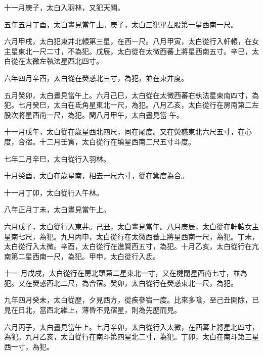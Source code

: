 \begin{pinyinscope}
 十一月庚子，太白入羽林，又犯天關。



 五年五月丁酉，太白晝見當午上。庚子，太白三犯畢左股第一星西南一尺。



 六月甲戌，太白犯東井北轅第三星，在西一尺。八月甲寅，太白從行入軒轅，在女主星東北一尺二寸，不為犯。戊辰，太白從在太微西蕃上將星西南五寸。辛巳，太白從在太微左執法星西北四寸。



 六年四月辛酉，太白從在熒惑北三寸，為犯，並在東井度。



 五月癸卯，太白晝見當午上。六月己巳，太白從在太微西蕃右執法星東南四寸，為犯。七月癸巳，太白在氐角星東北一尺，為犯。八月乙亥，太白從行在房南第二左股次將星西南一尺，為犯。閏八月甲午，太白晝見當
 午。



 十一月戊午，太白從在歲星西北四尺，同在尾度。又在熒惑東北六尺五寸，在心度，合宿。十二月壬寅，太白從行在填星西南二尺五寸斗度。



 七年二月辛巳，太白從行入羽林。



 十月癸酉，太白在歲星南，相去一尺六寸，從在箕度為合。



 十一月丁卯，太白從行入午林。



 八年正月丁未，太白晝見當午上。



 六月戊子，太白從行入東井。己丑，太白晝見當午。八月庚辰，太白從在軒轅女主星南七尺，為犯。九月丙申，太白從行在太微西蕃上將星西南一尺，為犯。丁未，太白從行入太微。辛酉，太白從行在進賢西五寸，為犯。十月乙亥，太白從行在亢南第二星西南一尺，為犯。甲申，太白從行入氐。



 十一
 月戊戌，太白從行在房北頭第二星東北一寸，又在楗閉星西南七寸，並為犯。又在熒惑西北二尺，為合宿。癸卯，太白從行在熒惑東北一尺，為犯。



 九年四月癸未，太白從歷，夕見西方，從疾參宿一度。比來多陰，至己丑開除，已見在日北，當西北維上，薄昏不見宿星，則為先歷而見。



 六月丙子，太白晝見當午上。七月辛卯，太白從行入太微，在西蕃上將星北四寸，為犯。九月乙亥，太白從行在南斗第四星北二寸，為犯。丁卯，太白在南斗第三星西一寸，為犯。




\end{pinyinscope}
